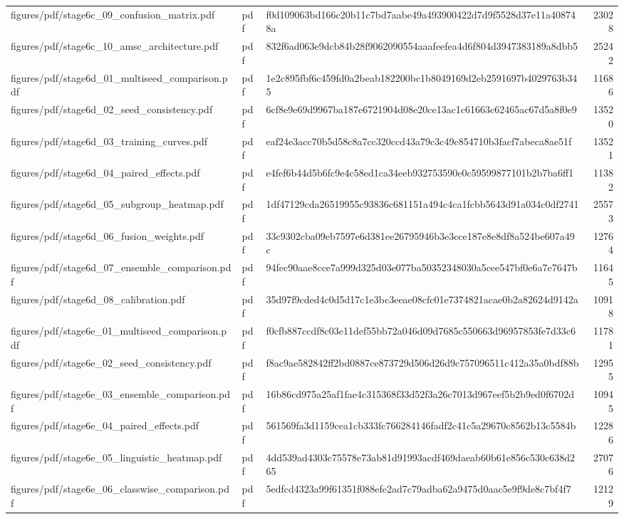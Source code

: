 \begin{tabular}{lllr}
figures/pdf/stage6c_09_confusion_matrix.pdf & pdf & f0d109063bd166c20b11c7bd7aabe49a493900422d7d9f5528d37e11a408748a & 23028 \\
figures/pdf/stage6c_10_amsc_architecture.pdf & pdf & 832f6ad063e9dcb84b28f9062090554aaafeefea4d6f804d3947383189a8dbb5 & 25242 \\
figures/pdf/stage6d_01_multiseed_comparison.pdf & pdf & 1e2c895fbf6c459fd0a2beab182200bc1b8049169d2eb2591697b4029763b345 & 11686 \\
figures/pdf/stage6d_02_seed_consistency.pdf & pdf & 6cf8e9e69d9967ba187e6721904d08e20ce13ac1c61663c62465ac67d5a8f0e9 & 13520 \\
figures/pdf/stage6d_03_training_curves.pdf & pdf & eaf24e3acc70b5d58c8a7cc320ccd43a79c3c49c854710b3facf7abeca8ae51f & 13521 \\
figures/pdf/stage6d_04_paired_effects.pdf & pdf & e4fef6b44d5b6fc9e4c58ed1ca34eeb932753590e0c59599877101b2b7ba6ff1 & 11382 \\
figures/pdf/stage6d_05_subgroup_heatmap.pdf & pdf & 1df47129cda26519955c93836c681151a494c4ca1fcbb5643d91a034c0df2741 & 25573 \\
figures/pdf/stage6d_06_fusion_weights.pdf & pdf & 33c9302cba09eb7597e6d381ee26795946b3e3cce187e8e8df8a524be607a49c & 12764 \\
figures/pdf/stage6d_07_ensemble_comparison.pdf & pdf & 94fec90aae8cce7a999d325d03e077ba50352348030a5cee547bf0e6a7e7647b & 11645 \\
figures/pdf/stage6d_08_calibration.pdf & pdf & 35d97f9cded4c0d5d17c1e3bc3eeae08cfc01e7374821acae0b2a82624d9142a & 10918 \\
figures/pdf/stage6e_01_multiseed_comparison.pdf & pdf & f0cfb887ccdf8c03e11def55bb72a046d09d7685c550663d96957853fe7d33c6 & 11781 \\
figures/pdf/stage6e_02_seed_consistency.pdf & pdf & f8ac9ae582842ff2bd0887ce873729d506d26d9c757096511c412a35a0bdf88b & 12955 \\
figures/pdf/stage6e_03_ensemble_comparison.pdf & pdf & 16b86cd975a25af1fae4c315368f33d52f3a26c7013d967eef5b2b9ed0f6702d & 10945 \\
figures/pdf/stage6e_04_paired_effects.pdf & pdf & 561569fa3d1159cea1cb333fc766284146fadf2c41c5a29670c8562b13c5584b & 12286 \\
figures/pdf/stage6e_05_linguistic_heatmap.pdf & pdf & 4dd539ad4303c75578e73ab81d91993acdf469daeab60b61e856c530c638d265 & 27076 \\
figures/pdf/stage6e_06_classwise_comparison.pdf & pdf & 5edfcd4323a99f61351f088efe2ad7c79adba62a9475d0aac5e9f9de8c7bf4f7 & 12129 \\

\end{tabular}
